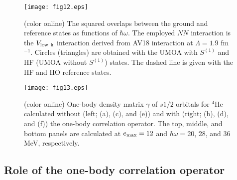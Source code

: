 \documentclass[aps,prc, dvips, twocolumn,groupedaddress,showkeys,showpacs,floatfix,superscriptaddress]{revtex4-1}
\newcommand{\<}{\langle}
\renewcommand{\>}{\rangle}
\begin{document}
\begin{figure}[t]
\texttt{[image: fig12.eps]}
\caption{\label{ovlap} (color online) The squared overlaps between the ground and
 reference states as functions of $\hbar\omega$.
 The employed $NN$ interaction is the $V_{\rm low \ k}$ interaction
   derived from AV18 interaction at $\Lambda = 1.9$ fm$^{-1}$.
 Circles (triangles) are obtained with the UMOA with $S^{(1)}$ and HF (UMOA without $S^{(1)}$) states.
 The dashed line is given with the HF and HO reference states.}
\end{figure}

\begin{figure}[t!]
\texttt{[image: fig13.eps]}
\caption{\label{fig:density_matrix}(color online)
  One-body density matrix $\gamma$ of $s1/2$ orbitals for $^{4}$He calculated without (left; (a), (c), and (e)) and with (right; (b), (d), and (f))
 the one-body correlation operator.
 The top, middle, and bottom panels are calculated at $e_{\rm max}=12$
 and $\hbar\omega =$20, 28, and 36 MeV, respectively.}
\end{figure}
\subsection{\label{Sec:Vlowk}Role of the one-body correlation operator}
\end{document}
